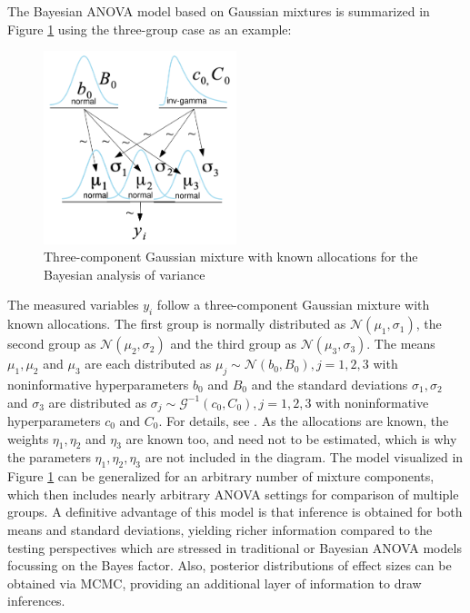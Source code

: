 	The Bayesian ANOVA model based on Gaussian mixtures is summarized in Figure \ref{fig:anovaModel} using the three-group case as an example:

\begin{figure}[h!]
    \centering
    \includegraphics[width=0.5\textwidth]{anovaModel}
        \caption{Three-component Gaussian mixture with known allocations for the Bayesian analysis of variance}
    \label{fig:anovaModel}
\end{figure}
The measured variables $y_i$ follow a three-component Gaussian mixture with known allocations. The first group is normally distributed as $\mathcal{N}(\mu_1,\sigma_1)$, the second group as $\mathcal{N}(\mu_2,\sigma_2)$ and the third group as $\mathcal{N}(\mu_3,\sigma_3)$. The means $\mu_1, \mu_2$ and $\mu_3$ are each distributed as $\mu_j \sim \mathcal{N}(b_0,B_0), j=1,2,3$ with noninformative hyperparameters $b_0$ and $B_0$ and the standard deviations $\sigma_1,\sigma_2$ and $\sigma_3$ are distributed as $\sigma_j \sim \mathcal{G}^{-1}(c_0,C_0), j=1,2,3$ with noninformative hyperparameters $c_0$ and $C_0$. For details, see \cite{Kelter2021StatisticsInBiosciences,Kelter2020JORSBayest}. As the allocations are known, the weights $\eta_1,\eta_2$ and $\eta_3$ are known too, and need not to be estimated, which is why the parameters $\eta_1,\eta_2,\eta_3$ are not included in the diagram. The model visualized in Figure \ref{fig:anovaModel} can be generalized for an arbitrary number of mixture components, which then includes nearly arbitrary ANOVA settings for comparison of multiple groups. A definitive advantage of this model is that inference is obtained for both means and standard deviations, yielding richer information compared to the testing perspectives which are stressed in traditional or Bayesian ANOVA models focussing on the Bayes factor. Also, posterior distributions of effect sizes can be obtained via MCMC, providing an additional layer of information to draw inferences.
	
